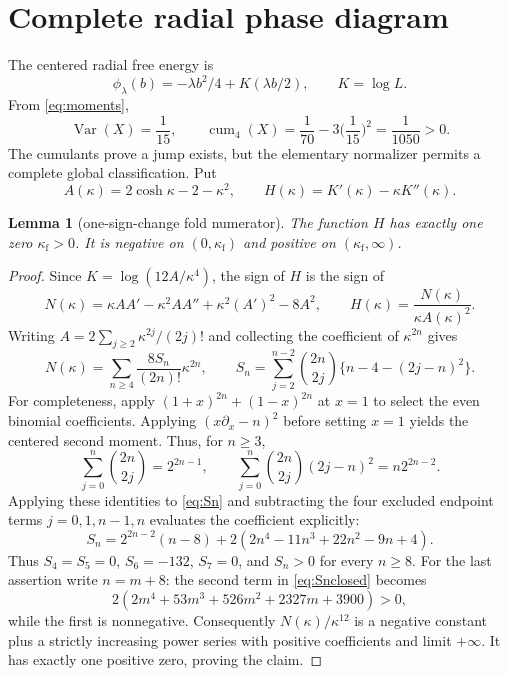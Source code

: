 \documentclass[11pt,a4paper]{article}
\newtheorem{lemma}[theorem]{Lemma}
\begin{document}
\section{Complete radial phase diagram}

The centered radial free energy is
\[
\phi_\lambda(b)=-\lambda b^2/4+K(\lambda b/2),\qquad K=\log L.
\]
From \cref{eq:moments},
\begin{equation}\label{eq:cumulants}
\operatorname{Var}(X)=\frac1{15},\qquad
\operatorname{cum}_4(X)=\frac1{70}-3\Big(\frac1{15}\Big)^2=\frac1{1050}>0.
\end{equation}
The cumulants prove a jump exists, but the elementary normalizer permits a complete global classification.  Put
\[
A(\kappa)=2\cosh\kappa-2-\kappa^2,\qquad
H(\kappa)=K'(\kappa)-\kappa K''(\kappa).
\]

\begin{lemma}[one-sign-change fold numerator]\label{lem:fold}
The function $H$ has exactly one zero $\kappa_{\mathrm f}>0$.  It is negative on $(0,\kappa_{\mathrm f})$ and positive on $(\kappa_{\mathrm f},\infty)$.
\end{lemma}

\begin{proof}
Since $K=\log(12A/\kappa^4)$, the sign of $H$ is the sign of
\begin{equation}\label{eq:N}
N(\kappa)=\kappa AA'-\kappa^2AA''+\kappa^2(A')^2-8A^2,
\qquad H(\kappa)=\frac{N(\kappa)}{\kappa A(\kappa)^2}.
\end{equation}
Writing $A=2\sum_{j\ge2}\kappa^{2j}/(2j)!$ and collecting the coefficient of $\kappa^{2n}$ gives
\begin{equation}\label{eq:Sn}
N(\kappa)=\sum_{n\ge4}\frac{8S_n}{(2n)!}\kappa^{2n},\qquad
S_n=\sum_{j=2}^{n-2}\binom{2n}{2j}\{n-4-(2j-n)^2\}.
\end{equation}
For completeness, apply $(1+x)^{2n}+(1-x)^{2n}$ at $x=1$ to select the even binomial coefficients.  Applying $(x\partial_x-n)^2$ before setting $x=1$ yields the centered second moment.  Thus, for $n\ge3$,
\[
\sum_{j=0}^{n}\binom{2n}{2j}=2^{2n-1},\qquad
\sum_{j=0}^{n}\binom{2n}{2j}(2j-n)^2=n2^{2n-2}.
\]
Applying these identities to \cref{eq:Sn} and subtracting the four excluded endpoint terms $j=0,1,n-1,n$ evaluates the coefficient explicitly:
\begin{equation}\label{eq:Snclosed}
S_n=2^{2n-2}(n-8)+2(2n^4-11n^3+22n^2-9n+4).
\end{equation}
Thus $S_4=S_5=0$, $S_6=-132$, $S_7=0$, and $S_n>0$ for every $n\ge8$.  For the last assertion write $n=m+8$: the second term in \cref{eq:Snclosed} becomes
\[
2(2m^4+53m^3+526m^2+2327m+3900)>0,
\]
while the first is nonnegative.  Consequently $N(\kappa)/\kappa^{12}$ is a negative constant plus a strictly increasing power series with positive coefficients and limit $+\infty$.  It has exactly one positive zero, proving the claim.
\end{proof}
\end{document}
